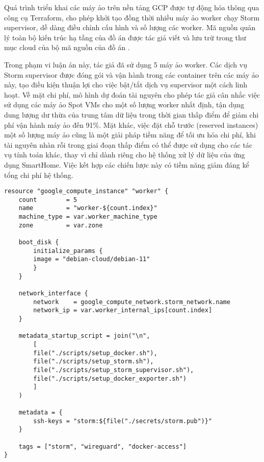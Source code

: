 Quá trình triển khai các máy ảo trên nền tảng GCP được tự động hóa thông qua công cụ Terraform, cho phép khởi tạo đồng thời nhiều máy ảo worker chạy Storm supervisor, dễ dàng điều chỉnh cấu hình và số lượng các worker. Mã nguồn quản lý toàn bộ kiến trúc hạ tầng của đồ án được tác giả viết và lưu trữ trong thư mục cloud của bộ mã nguồn của đồ án \autocite{lemionday_thesis_storm}.

Trong phạm vi luận án này, tác giả đã sử dụng 5 máy ảo worker. Các dịch vụ Storm supervisor được đóng gói và vận hành trong các container trên các máy ảo này, tạo điều kiện thuận lợi cho việc bật/tắt dịch vụ supervisor một cách linh hoạt. Về mặt chi phí, mô hình dự đoán tài nguyên cho phép tác giả cân nhắc việc sử dụng các máy ảo Spot VMs cho một số lượng worker nhất định, tận dụng dung lượng dư thừa của trung tâm dữ liệu trong thời gian thấp điểm để giảm chi phí vận hành máy ảo đến 91\%. Mặt khác, việc đặt chỗ trước (reserved instances) một số lượng máy ảo cũng là một giải pháp tiềm năng để tối ưu hóa chi phí, khi tài nguyên nhàn rỗi trong giai đoạn thấp điểm có thể được sử dụng cho các tác vụ tính toán khác, thay vì chỉ dành riêng cho hệ thống xử lý dữ liệu của ứng dụng SmartHome. Việc kết hợp các chiến lược này có tiềm năng giảm đáng kể tổng chi phí hệ thống.

\begin{lstlisting}[language=HCL, caption={Cấu hình khởi tạo máy ảo worker chạy Storm supervisor}]
resource "google_compute_instance" "worker" {
    count        = 5
    name         = "worker-${count.index}"
    machine_type = var.worker_machine_type
    zone         = var.zone

    boot_disk {
        initialize_params {
        image = "debian-cloud/debian-11"
        }
    }

    network_interface {
        network    = google_compute_network.storm_network.name
        network_ip = var.worker_internal_ips[count.index]
    }

    metadata_startup_script = join("\n",
        [
        file("./scripts/setup_docker.sh"),
        file("./scripts/setup_storm.sh"),
        file("./scripts/setup_storm_supervisor.sh"),
        file("./scripts/setup_docker_exporter.sh")
        ]
    )

    metadata = {
        ssh-keys = "storm:${file("./secrets/storm.pub")}"
    }

    tags = ["storm", "wireguard", "docker-access"]
}
\end{lstlisting}

